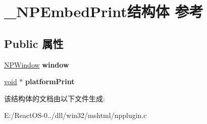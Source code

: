 \hypertarget{struct___n_p_embed_print}{}\section{\+\_\+\+N\+P\+Embed\+Print结构体 参考}
\label{struct___n_p_embed_print}
\subsection*{Public 属性}
\begin{DoxyCompactItemize}
\item 
\mbox{\label{struct___n_p_embed_print_a875099b1a13499d56ae6c84ade550a94}} 
\hyperlink{struct___n_p_window}{N\+P\+Window} {\bfseries window}
\item 
\mbox{\label{struct___n_p_embed_print_a147fecd7cac88b8873814bc493241b6e}} 
\hyperlink{interfacevoid}{void} $\ast$ {\bfseries platform\+Print}
\end{DoxyCompactItemize}


该结构体的文档由以下文件生成\+:\begin{DoxyCompactItemize}
\item 
E\+:/\+React\+O\+S-\/0../dll/win32/mshtml/npplugin.\+c\end{DoxyCompactItemize}
